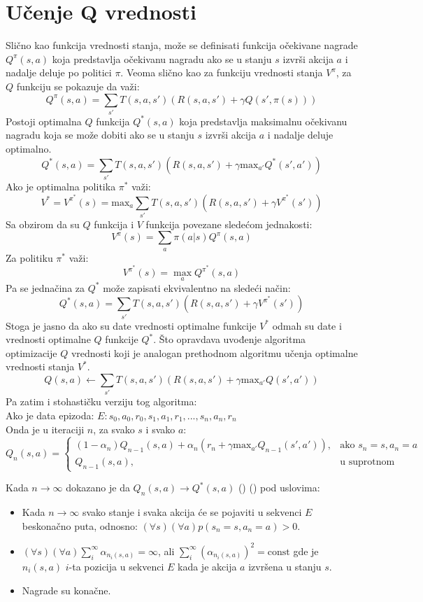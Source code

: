 \documentclass[a4paper,fleqn,12pt]{JMThesis}
\newcommand{\latin}{\fontencoding{T1}\selectfont\selectlanguage{english}}
\theoremstyle{plain}
\theoremstyle{definition}
\newcommand{\piopt}{{\pi}^{*}}
\theoremstyle{definition}
\begin{document}
\section{Učenje Q vrednosti}
Slično kao funkcija vrednosti stanja, može se definisati funkcija očekivane nagrade $Q^{\pi}(s,a)$ koja predstavlja očekivanu
nagradu ako se u stanju $s$ izvrši akcija $a$ i nadalje deluje po politici $\pi$. Veoma slično kao za funkciju vrednosti
stanja $V^{\pi}$, za $Q$ funkciju se pokazuje da važi:
\[
	Q^{\pi}(s,a) = \sum_{s'} T(s,a,s')(R(s,a,s') + \gamma Q(s',\pi(s)))
\]
Postoji optimalna $Q$ funkcija $Q^*(s,a)$ koja predstavlja maksimalnu očekivanu nagradu koja se može dobiti ako se u stanju
$s$ izvrši akcija $a$ i nadalje deluje optimalno.
\[
	Q^*(s,a) = \sum_{s'} T(s,a,s')(R(s,a,s') + \gamma \text{max}_{a'}Q^*(s',a'))
\]
Ako je optimalna politika $\piopt$ važi:
\[
	V^* = V^{\piopt}(s) = \text{max}_a \sum_{s'} T(s,a,s')(R(s,a,s') + \gamma V^{\piopt}(s'))
\]
Sa obzirom da su $Q$ funkcija i $V$ funkcija povezane sledećom jednakosti:
\[ V^{\pi}(s) = \sum_a \pi(a | s)Q^{\pi}(s,a) \]
Za politiku $\piopt$ važi:
\[ V^{\piopt}(s) = \max_a Q^{\piopt}(s,a) \]
Pa se jednačina za $Q^*$ može zapisati ekvivalentno na sledeći način:
\[
	Q^*(s,a) = \sum_{s'} T(s,a,s')(R(s,a,s') + \gamma V^{\piopt}(s'))
\]
Stoga je jasno da ako su date vrednosti optimalne funkcije $V^*$ odmah su date i vrednosti optimalne $Q$ funkcije $Q^*$.
Što opravdava uvođenje algoritma optimizacije $Q$ vrednosti koji je analogan prethodnom algoritmu učenja optimalne vrednosti stanja $V^*$.
\[ Q(s,a) \leftarrow \sum_{s'}T(s,a,s')(R(s,a,s')+\gamma \text{max}_{a'}Q(s',a')) \]
Pa zatim i stohastičku verziju tog algoritma:\\
Ako je data epizoda: $E: s_0,a_0,r_0,s_1,a_1,r_1,...,s_n,a_n,r_n$\\
Onda je u iteraciji $n$, za svako $s$ i svako $a$:\\
\[ 
	Q_n(s,a) =
	\begin{cases}
		(1-\alpha_n)Q_{n-1}(s,a) + \alpha_n (r_n + \gamma \text{max}_{a'}Q_{n-1}(s',a')), & \text{ako } s_n = s, a_n = a\\
		Q_{n-1}(s,a), & \text{u suprotnom}
	\end{cases}
\]

Kada $n \to \infty$ dokazano je da $Q_n(s,a) \to Q^*(s,a)$ {\latin (\cite{watkins1992q}) (\cite{sutton2018reinforcement})} pod uslovima:
\begin{itemize}
	\item Kada $n \to \infty$ svako stanje i svaka akcija će se pojaviti u sekvenci $E$ beskonačno puta, odnosno: $(\forall s)(\forall a)p(s_n = s, a_n = a) > 0$.
 	\item $(\forall s)(\forall a)  \sum_i^{\infty}\alpha_{n_i(s,a)} = \infty$, ali $\sum_i^{\infty}\left(\alpha_{ {n_i(s,a)}}\right)^2 = \text{const}$ gde je $n_i(s,a)$ $i$-ta pozicija u sekvenci $E$ kada je akcija $a$ izvršena u stanju $s$.
  	\item Nagrade su konačne. 
\end{itemize}
\end{document}
